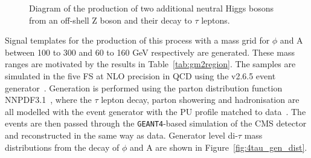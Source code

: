 \begin{figure}[!hbtp]
\centering
{}
\vspace*{10mm}
\caption[Diagram of the production of two additional neutral Higgs bosons from an off-shell Z boson and their decay to $\tau$ leptons.]{Diagram of the production of two additional neutral Higgs bosons from an off-shell Z boson and their decay to $\tau$ leptons.}
\label{fig:4tau_feynamn}
\end{figure}

Signal templates for the production of this process with a mass grid for $\phi$ and A between 100 to 300 and 60 to 160 GeV respectively are generated.
These mass ranges are motivated by the results in Table~\ref{tab:gm2region}.
The samples are simulated in the five \ac{FS} at \ac{NLO} precision in QCD using the \MGvATNLO v2.6.5 event generator~\cite{Alwall:2011uj}.
Generation is performed using the parton distribution function NNPDF3.1~\cite{Ball:2014uwa,Ball:2017nwa}, where the $\tau$ lepton decay, parton showering and hadronisation are all modelled with the \PYTHIA event generator with the \ac{PU} profile matched to data~\cite{Sirunyan:2019dfx,Sjostrand:2014zea}.
The events are then passed through the \texttt{GEANT4}-based \cite{Agostinelli:2002hh} simulation of the \ac{CMS} detector and reconstructed in the same way as data.
Generator level di-$\tau$ mass distributions from the decay of $\phi$ and A are shown in Figure~\ref{fig:4tau_gen_dist}.\\

